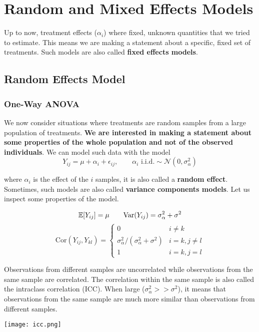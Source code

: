 \section{Random and Mixed Effects Models}

Up to now, treatment effects ($\alpha_i$) where fixed, unknown quantities that we tried to estimate. This means we are making a statement about a specific, fixed set of treatments. Such models are also called \textbf{fixed effects models}.

\subsection{Random Effects Model}

\subsubsection{One-Way ANOVA}

We now consider situations where treatments are random samples from a large population of treatments. \textbf{We are interested in making a statement about some properties of the whole population and not of the observed individuals}. We can model such data with the model
$$Y_{ij} = \mu + \alpha_i + \epsilon_{ij}, \qquad \alpha_i \text{ i.i.d.} \sim \mathcal{N}(0, \sigma_\alpha^2)$$

where $\alpha_i$ is the effect of the $i$ samples, it is also called a \textbf{random effect}. Sometimes, such models are also called \textbf{variance components models}. Let us inspect some properties of the model.

$$\mathbb{E} [Y_{ij}] = \mu \qquad \text{Var}(Y_{ij}) = \sigma_\alpha^2 + \sigma^2$$
$$\text{Cor}(Y_{ij}, Y_{kl}) = \begin{cases}
	0 & i \neq k \\
	\sigma_\alpha^2 / (\sigma_\alpha^2 + \sigma^2) & i = k, j \neq l \\
	1 & i = k, j = l
\end{cases}$$

Observations from different samples are uncorrelated while observations from the same sample are correlated. The correlation within the same sample is also called the intraclass correlation (ICC). When large ($\sigma_\alpha^2 >> \sigma^2$), it means that observations from the same sample are much more similar than observations from different samples.

\begin{center}
	\texttt{[image: icc.png]}
\end{center}

